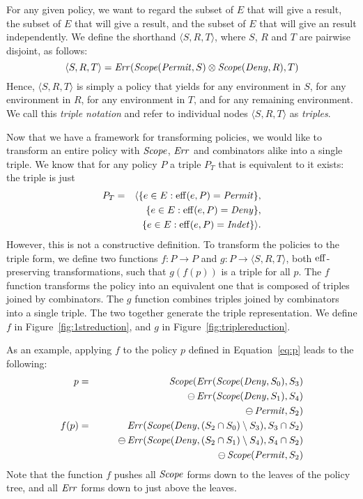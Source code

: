 For any given policy, we want to regard the subset of $E$ that will
give a \Permit{} result, the subset of $E$ that will give a \Deny{}
result, and the subset of $E$ that will give an \Indeterminate{} result
independently.  We define the shorthand $\langle S, R, T \rangle$,
where $S$, $R$ and $T$ are pairwise disjoint, as follows:
\begin{equation*}
  \langle S, R, T \rangle = \text{\textit{Err}} (\text{\textit{Scope}} (\text{\textit{Permit}}, S) \otimes \text{\textit{Scope}} (\text{\textit{Deny}}, R), T)
\end{equation*}
Hence, $\langle S, R, T \rangle$ is simply a policy
that yields \Permit{} for any environment in $S$,
\Deny{} for any environment in $R$,
\Indeterminate{} for any environment in $T$,
and \NotApplicable{} for any remaining environment.
We call this \emph{triple notation} and refer to individual nodes
$\langle S, R, T \rangle$ as \emph{triples}.

Now that we have a framework for transforming policies, we would like
to transform an entire policy with $\text{\textit{Scope}}$, $\text{\textit{Err}}$ and combinators alike
into a single triple.  We know that for any policy $P$ a triple $P_T$
that is equivalent to it exists: the triple is just 
\begin{eqnarray*}
P_T & = & \langle \{
e \in E : \operatorname{eff} (e, P) = \text{\textit{Permit}} \}, \\
&& \;\, \{ e \in E : \operatorname{eff} (e, P) = \text{\textit{Deny}} \}, \\
&& \;\, \{ e \in E : \operatorname{eff} (e, P) = \text{\textit{Indet}} \}\rangle.
\end{eqnarray*}
However,
this is not a constructive definition.  To transform the policies to
the triple form, we define two functions 
$f : P   \rightarrow  P$ and $g : P \rightarrow \langle S, R, T \rangle$, both
$\operatorname{eff}$-preserving transformations, such that $g (f(p))$ is a triple
for all $p$.  The $f$ function transforms the policy into an
equivalent one that is composed of triples joined by combinators.  The
$g$ function combines triples joined by combinators into a single
triple.  The two together generate the triple representation.  We
define $f$ in Figure~\ref{fig:1streduction}, and $g$ in
Figure~\ref{fig:triplereduction}.

As an example, applying $f$ to the policy $p$ defined in
Equation~\eqref{eq:p} leads to the following:
\begin{eqnarray*}
  p & = & \text{\textit{Scope}} (\text{\textit{Err}} (\text{\textit{Scope}} (\text{\textit{Deny}}, S_0), S_3) \\
  & & \qquad \ominus \, \text{\textit{Err}} (\text{\textit{Scope}} (\text{\textit{Deny}}, S_1), S_4) \\
  & & \qquad \ominus \, \text{\textit{Permit}}, S_2) \nonumber \\
  f(p)  & = & \text{\textit{Err}} (\text{\textit{Scope}} (\text{\textit{Deny}}, (S_2 \cap S_0) \setminus S_3), S_3 \cap S_2) \\
  & & \qquad \ominus \,
  \text{\textit{Err}} (\text{\textit{Scope}} (\text{\textit{Deny}}, (S_2 \cap S_1) \setminus S_4), S_4 \cap S_2) \\
  & & \qquad \ominus \, \text{\textit{Scope}} (\text{\textit{Permit}}, S_2)
\end{eqnarray*}
Note that the function $f$ pushes all $\text{\textit{Scope}}$ forms down to the leaves
of the policy tree, and all $\text{\textit{Err}}$ forms down to just above the leaves.

